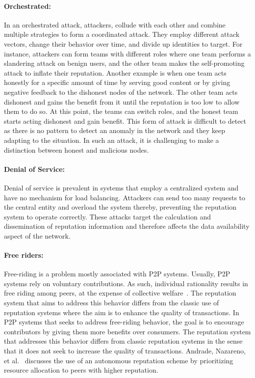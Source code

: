 \paragraph{Orchestrated:} In an orchestrated attack, attackers, collude with
each other and combine multiple strategies to form a coordinated attack. They
employ different attack vectors, change their behavior over time, and divide up
identities to target. For instance, attackers can form teams with different
roles where one team performs a slandering attack on benign users, and the
other team makes the self-promoting attack to inflate their reputation. Another
example is when one team acts honestly for a specific amount of time by serving
good content or by giving negative feedback to the dishonest nodes of the
network. The other team acts dishonest and gains the benefit from it until the
reputation is too low to allow them to do so. At this point, the teams can
switch roles, and the honest team starts acting dishonest and gain benefit.
This form of attack is difficult to detect as there is no pattern to detect an
anomaly in the network and they keep adapting to the situation. In such an
attack, it is challenging to make a distinction between honest and malicious
nodes. 
\paragraph{Denial of Service:} Denial of service is prevalent in systems that
employ a centralized system and have no mechanism for load balancing. Attackers
can send too many requests to the central entity and overload the system
thereby, preventing the reputation system to operate correctly. These attacks
target the calculation and dissemination of reputation information and
therefore affects the data availability aspect of the network.  
\paragraph{Free riders:} Free-riding is a problem mostly associated with P2P
systems. Usually, P2P systems rely on voluntary contributions. As such,
individual rationality results in free riding among peers, at the expense of
collective welfare~\cite{feldman2006free}. The reputation system that aims to
address this behavior differs from the classic use of reputation systems where
the aim is to enhance the quality of transactions. In P2P systems that seeks to
address free-riding behavior, the goal is to encourage contributors by giving
them more benefits over consumers. The reputation system that addresses this
behavior differs from classic reputation systems in the sense that it does not
seek to increase the quality of transactions. Andrade, Nazareno, et
al.~\cite{andrade2004can} discusses the use of an autonomous reputation scheme
by prioritizing resource allocation to peers with higher reputation. 


